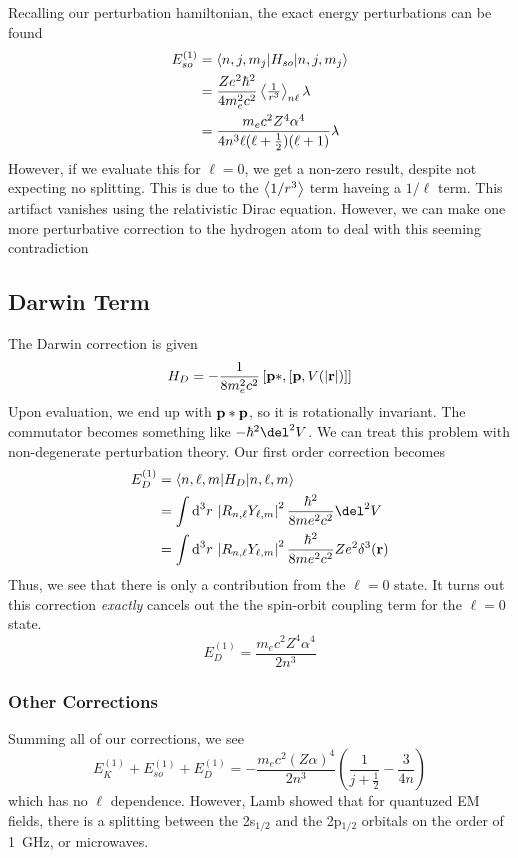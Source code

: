 Recalling our perturbation hamiltonian, the exact energy perturbations can be found
\begin{align}
	E_{so}^{(1)} &= \langle n,j,m_j\rvert H_{so} \lvert n,j,m_j\rangle\nonumber\\
		     &=\frac{Ze^2\hbar^2}{4m_e^2c^2}\left\langle \begin{matrix}\frac{1}{r^3}\end{matrix} \right\rangle_{n\ell}\lambda\nonumber\\
		     &=\frac{m_ec^2Z^4\alpha^4}{4n^3\ell(\ell+\tfrac{1}{2})(\ell+1)}\lambda
\end{align}
However, if we evaluate this for \(\ell = 0\), we get a non-zero result, despite not expecting no splitting. This is due to the \(\left\langle \begin{matrix}1/r^3\end{matrix} \right\rangle\) term haveing a \(1/\ell\) term. This artifact vanishes using the relativistic Dirac equation. However, we can make one more perturbative correction to the hydrogen atom to deal with this seeming contradiction

\subsection{Darwin Term}
The Darwin correction is given
\begin{equation}H_D = -\frac{1}{8m_e^2c^2}\left[\mathbf{p} *, \left[\mathbf{p}, V(\left|\mathbf{r}\right|)\right]\right]\end{equation}
Upon evaluation, we end up with \(\mathbf{p}*\mathbf{p}\), so it is rotationally invariant. The commutator becomes something like \(-\hbar^2\del^2 V\). We can treat this problem with non-degenerate perturbation theory. Our first order correction becomes
\begin{align*}
	E_D^{(1)} &=\b{n,\ell,m}H_D\k{n,\ell, m}\\
		  &=\int\d[3]{r}\abs{R_{n,\ell}Y_{\ell, m}}^2\frac{\hbar^2}{8me^2c^2}\del^2 V\\
		  &=\int\d[3]{r}\abs{R_{n,\ell}Y_{\ell, m}}^2\frac{\hbar^2}{8me^2c^2}Ze^2\delta^3(\vb r)
\end{align*}
Thus, we see that there is only a contribution from the \(\ell=0\) state. It turns out this correction \emph{exactly} cancels out the the spin-orbit coupling term for the \(\ell=0\) state.
\[E_D^{(1)} = \frac{m_ec^2Z^4\alpha^4}{2n^3}\]

\subsubsection{Other Corrections}
Summing all of our corrections, we see
\begin{equation}
	E_K^{(1)}+E_{so}^{(1)}+E_D^{(1)} = -\frac{m_ec^2(Z\alpha)^4}{2n^3}\left(\frac{1}{j+\frac{1}{2}}-\frac{3}{4n}\right)
\end{equation}
which has no \(\ell\) dependence. However, Lamb showed that for quantuzed EM fields, there is a splitting between the 2s\(_{1/2}\) and the 2p\(_{1/2}\) orbitals on the order of \SI{1}{GHz}, or microwaves.

